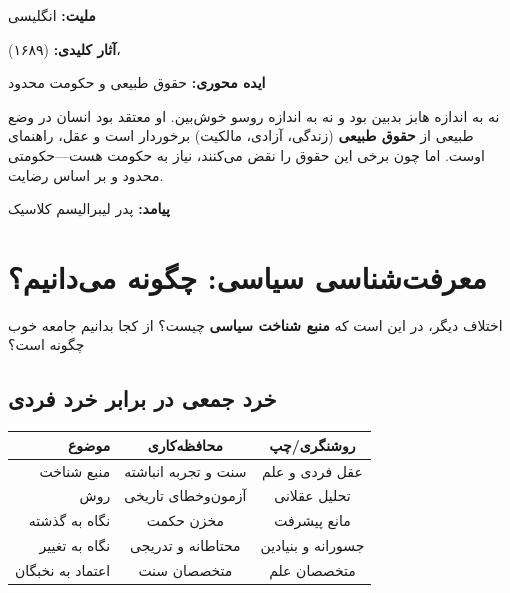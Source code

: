\begin{personbox}
	
	\textbf{ملیت:} انگلیسی
	
	\textbf{آثار کلیدی:}  (۱۶۸۹)، 
	
	\textbf{ایده محوری:} حقوق طبیعی و حکومت محدود
	
	\mediumspace
	
	 نه به اندازه هابز بدبین بود و نه به اندازه روسو خوش‌بین. او معتقد بود انسان در وضع طبیعی از \textbf{حقوق طبیعی} (زندگی، آزادی، مالکیت) برخوردار است و عقل، راهنمای اوست. اما چون برخی این حقوق را نقض می‌کنند، نیاز به حکومت هست—حکومتی محدود و بر اساس رضایت.
	
	\mediumspace
	
	\textbf{پیامد:} پدر لیبرالیسم کلاسیک
\end{personbox}

\section{معرفت‌شناسی سیاسی: چگونه می‌دانیم؟}

اختلاف دیگر، در این است که \textbf{منبع شناخت سیاسی} چیست؟ از کجا بدانیم جامعه خوب چگونه است؟

\subsection{خرد جمعی در برابر خرد فردی}

\begin{comparebox}
	\vspace{-4pt}
	\begin{table}[H]
		\centering
		\begin{tabular}{r|c|c}
			\toprule
			\textbf{موضوع} & \textbf{محافظه‌کاری} & \textbf{روشنگری/چپ} \\
			\midrule
			منبع شناخت & سنت و تجربه انباشته & عقل فردی و علم \\
			روش & آزمون‌وخطای تاریخی & تحلیل عقلانی \\
			نگاه به گذشته & مخزن حکمت & مانع پیشرفت \\
			نگاه به تغییر & محتاطانه و تدریجی & جسورانه و بنیادین \\
			اعتماد به نخبگان & متخصصان سنت & متخصصان علم \\
			\bottomrule
		\end{tabular}
	\end{table}
	\vspace{-6pt}
\end{comparebox}

